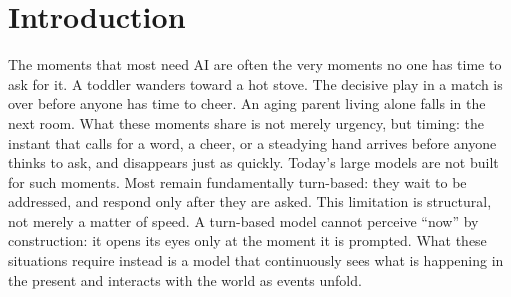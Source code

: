 \section{Introduction}
\label{sec:introduction}
The moments that most need AI are often the very moments no one has time to ask for it. 
A toddler wanders toward a hot stove. The decisive play in a match is over before anyone has time to cheer. An aging parent living alone falls in the next room. What these moments share is not merely urgency, but timing: the instant that calls for a word, a cheer, or a steadying hand arrives before anyone thinks to ask, and disappears just as quickly.
Today’s large models are not built for such moments. Most remain fundamentally turn-based: they wait to be addressed, and respond only after they are asked.
This limitation is structural, not merely a matter of speed. A turn-based model cannot perceive ``now'' by construction: it opens its eyes only at the moment it is prompted. What these situations require instead is a model that continuously sees what is happening in the present and interacts with the world as events unfold.


